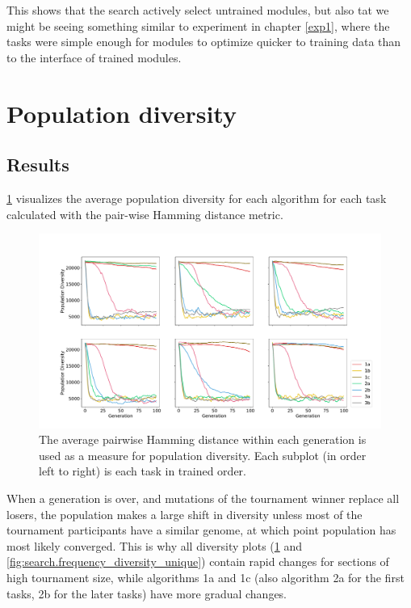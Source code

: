 This shows that the search actively select untrained modules, but also tat we might be seeing something similar to experiment in chapter \ref{exp1}, where the tasks were simple enough for modules to optimize quicker to training data than to the interface of trained modules.

\section{Population diversity}
\label{exp2:diversity}
\subsection{Results}
\ref{fig:search.hamming_diversity} visualizes the average population diversity for each algorithm for each task calculated with the pair-wise Hamming distance metric. 

\begin{figure}
    \includegraphics[width=1.2\textwidth,center]{Chapters/4.Experiments/exp2/figures/inuse/Average_population_diversity_reduced_hamming.pdf}
    \caption[Pair-wise Hamming distance diversity]{The average pairwise Hamming distance within each generation is used as a measure for population diversity. Each subplot (in order left to right) is each task in trained order.}
    \label{fig:search.hamming_diversity}
\end{figure}

When a generation is over, and mutations of the tournament winner replace all losers, the population makes a large shift in diversity unless most of the tournament participants have a similar genome, at which point population has most likely converged. This is why all diversity plots (\ref{fig:search.hamming_diversity} and \ref{fig:search.frequency_diversity_unique}) contain rapid changes for sections of high tournament size, while algorithms 1a and 1c (also algorithm 2a for the first tasks, 2b for the later tasks) have more gradual changes. 

